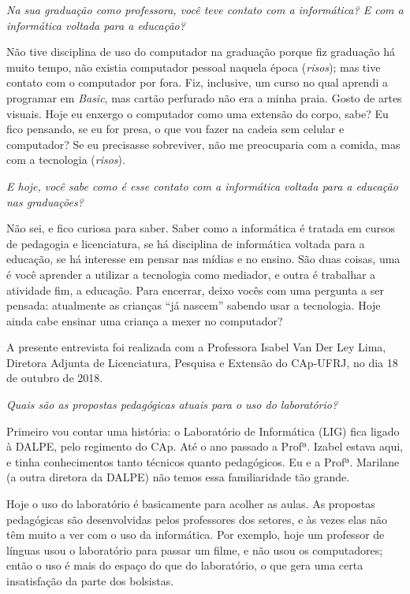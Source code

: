 \textit{Na sua graduação como professora, você teve contato com a informática? E com a informática voltada para a educação?}

Não tive disciplina de uso do computador na graduação porque fiz graduação há muito tempo, não existia computador pessoal naquela época (\textit{risos}); mas tive contato com o computador por fora. Fiz, inclusive, um curso no qual aprendi a programar em \textit{Basic}, mas cartão perfurado não era a minha praia. Gosto de artes visuais.
Hoje eu enxergo o computador como uma extensão do corpo, sabe? Eu fico pensando, se eu for presa, o que vou fazer na cadeia sem celular e computador? Se eu precisasse sobreviver, não me preocuparia com a comida, mas com a tecnologia (\textit{risos}).

\textit{E hoje, você sabe como é esse contato com a informática voltada para a educação nas graduações?}

Não sei, e fico curiosa para saber. Saber como a informática é tratada em cursos de pedagogia e licenciatura, se há disciplina de informática voltada para a educação, se há interesse em pensar nas mídias e no ensino. São duas coisas, uma é você aprender a utilizar a tecnologia como mediador, e outra é trabalhar a atividade fim, a educação. Para encerrar, deixo vocês com uma pergunta a ser pensada: atualmente as crianças “já nascem” sabendo usar a tecnologia. Hoje ainda cabe ensinar uma criança a mexer no computador?

\label{anx:LABEL_ANX_B}

A presente entrevista foi realizada com a Professora Isabel Van Der Ley Lima, Diretora Adjunta de Licenciatura, Pesquisa e Extensão do CAp-UFRJ, no dia 18 de outubro de 2018.

\textit{Quais são as propostas pedagógicas atuais para o uso do laboratório?}

Primeiro vou contar uma história: o Laboratório de Informática (LIG) fica ligado à DALPE, pelo regimento do CAp. Até o ano passado a Profª. Izabel estava aqui, e tinha conhecimentos tanto técnicos quanto pedagógicos. Eu e a Profª. Marilane (a outra diretora da DALPE) não temos essa familiaridade tão grande.

Hoje o uso do laboratório é basicamente para acolher as aulas. As propostas pedagógicas são desenvolvidas pelos professores dos setores, e às vezes elas não têm muito a ver com o uso da informática. Por exemplo, hoje um professor de línguas usou o laboratório para passar um filme, e não usou os computadores; então o uso é mais do espaço do que do laboratório, o que gera uma certa insatisfação da parte dos bolsistas.

